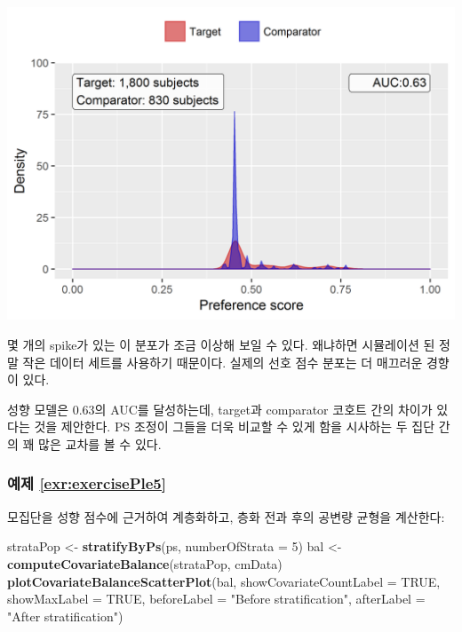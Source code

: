 \documentclass[11pt]{book}
\newenvironment{Shaded}{\begin{snugshade}}{\end{snugshade}}
\newcommand{\KeywordTok}[1]{\textcolor[rgb]{0.13,0.29,0.53}{\textbf{#1}}}
\newcommand{\DataTypeTok}[1]{\textcolor[rgb]{0.13,0.29,0.53}{#1}}
\newcommand{\DecValTok}[1]{\textcolor[rgb]{0.00,0.00,0.81}{#1}}
\newcommand{\StringTok}[1]{\textcolor[rgb]{0.31,0.60,0.02}{#1}}
\newcommand{\OtherTok}[1]{\textcolor[rgb]{0.56,0.35,0.01}{#1}}
\newcommand{\NormalTok}[1]{#1}
\theoremstyle{definition}
\theoremstyle{definition}
\theoremstyle{definition}
\theoremstyle{remark}
\begin{document}
\begin{center}\includegraphics[width=0.8\linewidth]{images/SuggestedAnswers/ps} \end{center}

몇 개의 spike가 있는 이 분포가 조금 이상해 보일 수 있다. 왜냐하면
시뮬레이션 된 정말 작은 데이터 세트를 사용하기 때문이다. 실제의 선호
점수 분포는 더 매끄러운 경향이 있다.

성향 모델은 0.63의 AUC를 달성하는데, target과 comparator 코호트 간의
차이가 있다는 것을 제안한다. PS 조정이 그들을 더욱 비교할 수 있게 함을
시사하는 두 집단 간의 꽤 많은 교차를 볼 수 있다.

\subsubsection*{예제 \ref{exr:exercisePle5}}\label{-refexrexerciseple5}

모집단을 성향 점수에 근거하여 계층화하고, 층화 전과 후의 공변량 균형을
계산한다:

\begin{Shaded}
\begin{Highlighting}[]
\NormalTok{strataPop <-}\StringTok{ }\KeywordTok{stratifyByPs}\NormalTok{(ps, }\DataTypeTok{numberOfStrata =} \DecValTok{5}\NormalTok{)}
\NormalTok{bal <-}\StringTok{ }\KeywordTok{computeCovariateBalance}\NormalTok{(strataPop, cmData)}
\KeywordTok{plotCovariateBalanceScatterPlot}\NormalTok{(bal, }
                                \DataTypeTok{showCovariateCountLabel =} \OtherTok{TRUE}\NormalTok{, }
                                \DataTypeTok{showMaxLabel =} \OtherTok{TRUE}\NormalTok{, }
                                \DataTypeTok{beforeLabel =} \StringTok{"Before stratification"}\NormalTok{, }
                                \DataTypeTok{afterLabel =} \StringTok{"After stratification"}\NormalTok{)}
\end{Highlighting}
\end{Shaded}
\end{document}
